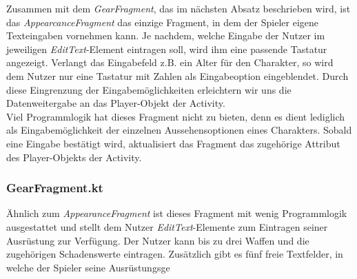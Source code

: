 Zusammen mit dem \textit{GearFragment}, das im nächsten Absatz beschrieben wird, ist das \textit{AppearcanceFragment} das einzige Fragment, in dem der Spieler eigene Texteingaben vornehmen kann. Je nachdem, welche Eingabe der Nutzer im jeweiligen \textit{EditText}-Element eintragen soll, wird ihm eine passende Tastatur angezeigt. Verlangt das Eingabefeld z.B. ein Alter für den Charakter, so wird dem Nutzer nur eine Tastatur mit Zahlen als Eingabeoption eingeblendet. Durch diese Eingrenzung der Eingabemöglichkeiten erleichtern wir uns die Datenweitergabe an das Player-Objekt der Activity.\\

Viel Programmlogik hat dieses Fragment nicht zu bieten, denn es dient lediglich als Eingabemöglichkeit der einzelnen Aussehensoptionen eines Charakters. Sobald eine Eingabe bestätigt wird, aktualisiert das Fragment das zugehörige Attribut des Player-Objekts der Activity.

\subsubsection{GearFragment.kt}
Ähnlich zum \textit{AppearanceFragment} ist dieses Fragment mit wenig Programmlogik ausgestattet und stellt dem Nutzer \textit{EditText}-Elemente zum Eintragen seiner Ausrüstung zur Verfügung. Der Nutzer kann bis zu drei Waffen und die zugehörigen Schadenswerte eintragen. Zusätzlich gibt es fünf freie Textfelder, in welche der Spieler seine Ausrüstungsge

